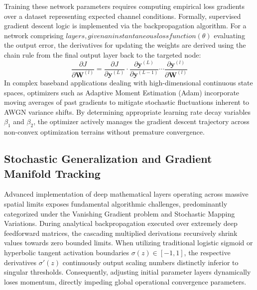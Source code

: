 \documentclass[a4paper,14pt]{extreport}
\begin{document}
Training these network parameters requires computing empirical loss gradients over a dataset representing expected channel conditions. Formally, supervised gradient descent logic is implemented via the backpropagation algorithm. For a network comprising $ layers, given an instantaneous loss function (\theta)$ evaluating the output error, the derivatives for updating the weights are derived using the chain rule from the final output layer back to the targeted node:
\begin{equation}
    \frac{\partial J}{\partial \mathbf{W}^{(l)}} = \frac{\partial J}{\partial \mathbf{y}^{(L)}} \cdot \frac{\partial \mathbf{y}^{(L)}}{\partial \mathbf{y}^{(L-1)}} \cdots \frac{\partial \mathbf{y}^{(l)}}{\partial \mathbf{W}^{(l)}}
\end{equation}
In complex baseband applications dealing with high-dimensional continuous state spaces, optimizers such as Adaptive Moment Estimation (Adam) incorporate moving averages of past gradients to mitigate stochastic fluctuations inherent to AWGN variance shifts. By determining appropriate learning rate decay variables $\beta_1$ and $\beta_2$, the optimizer actively manages the gradient descent trajectory across non-convex optimization terrains without premature convergence.

\subsection{Stochastic Generalization and Gradient Manifold Tracking}
Advanced implementation of deep mathematical layers operating across massive spatial limits exposes fundamental algorithmic challenges, predominantly categorized under the Vanishing Gradient problem and Stochastic Mapping Variations. During analytical backpropagation executed over extremely deep feedforward matrices, the cascading multiplied derivations recursively shrink values towards zero bounded limits. When utilizing traditional logistic sigmoid or hyperbolic tangent activation boundaries $\sigma(z) \in [-1, 1]$, the respective derivatives $\sigma'(z)$ continuously output scaling numbers distinctly inferior to singular thresholds. Consequently, adjusting initial parameter layers dynamically loses momentum, directly impeding global operational convergence parameters. 
\end{document}
